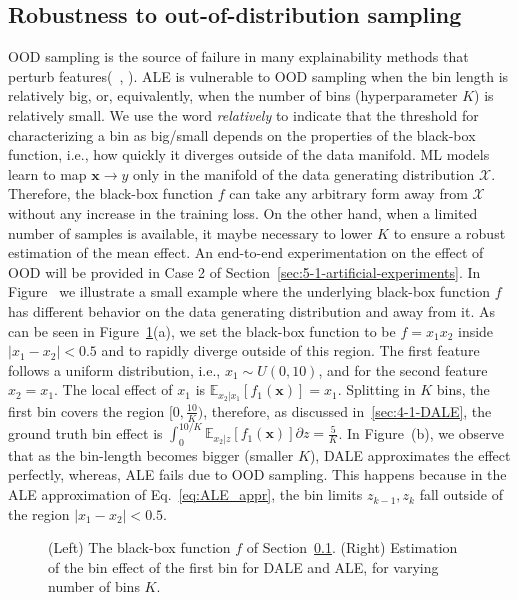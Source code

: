 \documentclass[wcp]{jmlr}
\newcommand{\Xb}{\mathcal{X}}
\newcommand{\xb}{\mathbf{x}}
\newcommand{\E}{\mathbb{E}}
\begin{document}
\subsection{Robustness to out-of-distribution sampling}
\label{sec:4-3-robustness} OOD sampling is the source of failure in many explainability methods that perturb features(~\cite{Baniecki2022}, \cite{Hooker2021}). ALE is vulnerable to OOD sampling when the bin length is relatively big, or, equivalently, when the number of bins (hyperparameter \(K\)) is relatively small. We use the word \textit{relatively} to indicate that the threshold for characterizing a bin as big/small depends on the properties of the black-box function, i.e., how quickly it diverges outside of the data manifold. ML models learn to map \( \xb \rightarrow y \) only in the manifold of the data generating distribution \(\Xb\). Therefore, the black-box function \(f\) can take any arbitrary form away from \(\Xb\) without any increase in the training loss. On the other hand, when a limited number of samples is available, it maybe necessary to lower \(K\) to ensure a robust estimation of the mean effect. An end-to-end experimentation on the effect of OOD will be provided in Case 2 of Section~\ref{sec:5-1-artificial-experiments}.
%
In Figure~ we illustrate a small example where the underlying black-box function \(f\) has different behavior on the data generating distribution and away from it. As can be seen in Figure~\ref{fig:example-different-bins}(a), we set the black-box function to be \(f = x_1x_2\) inside \(|x_1-x_2| < 0.5\) and to rapidly diverge outside of this region. The first feature follows a uniform distribution, i.e., \(x_1 \sim U(0,10)\), and for the second feature \(x_2=x_1\). The local effect of \(x_1\) is \(\E_{x_2|x_1} \left [ f_1(\xb) \right ] = x_1 \). Splitting in \(K\) bins, the first bin covers the region \( [0, \frac{10}{K} ) \), therefore, as discussed in~\ref{sec:4-1-DALE}, the ground truth bin effect is \(\int_0^{10/K} \E_{x_2|z}\left[f_1(\xb)\right]\partial z = \frac{5}{K}\). In Figure~(b), we observe that as the bin-length becomes bigger (smaller \(K\)), DALE approximates the effect perfectly, whereas, ALE fails due to OOD sampling. This happens because in the ALE approximation of Eq.~\eqref{eq:ALE_appr}, the bin limits \(z_{k-1}, z_k\) fall outside of the region \(|x_1-x_2| < 0.5\).

\begin{figure}[h] \centering \resizebox{.35\columnwidth}{!}{} \resizebox{.35\columnwidth}{!}{}
  \caption[Example comparison]{(Left) The black-box function \(f\) of Section~\ref{sec:4-3-robustness}. (Right) Estimation of the bin effect of the first bin for DALE and ALE, for varying number of bins \(K\).}
  \label{fig:example-different-bins}
\end{figure}
\end{document}
